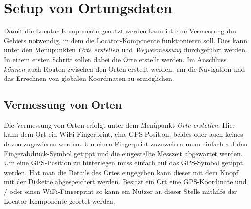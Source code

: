 \section{Setup von Ortungsdaten}
Damit die Locator-Komponente genutzt werden kann ist eine Vermessung des Gebiets notwendig, in dem die Locator-Komponente funktionieren soll. Dies kann unter den Menüpunkten \textit{Orte erstellen} und \textit{Wegvermessung} durchgeführt werden. In einem ersten Schritt sollen dabei die Orte erstellt werden. Im Anschluss \textit{können} auch Routen zwischen den Orten erstellt werden, um die Navigation und das Errechnen von globalen Koordinaten zu ermöglichen.

\subsection{Vermessung von Orten}
Die Vermessung von Orten erfolgt unter dem Menüpunkt \textit{Orte erstellen}. Hier kann dem Ort ein WiFi-Fingerprint, eine GPS-Position, beides oder auch keines davon zugewiesen werden. Um einen Fingerprint zuzuweisen muss einfach auf das Fingerabdruck-Symbol getippt und die eingestellte Messzeit abgewartet werden. Um eine GPS-Position zu hinterlegen muss einfach auf das GPS-Symbol getippt werden. Hat man die Details des Ortes eingegeben kann dieser mit dem Knopf mit der Diskette abgespeichert werden. Besitzt ein Ort eine GPS-Koordinate und / oder einen WiFi-Fingerprint so kann ein Nutzer an dieser Stelle mithilfe der Locator-Komponente geortet werden.

